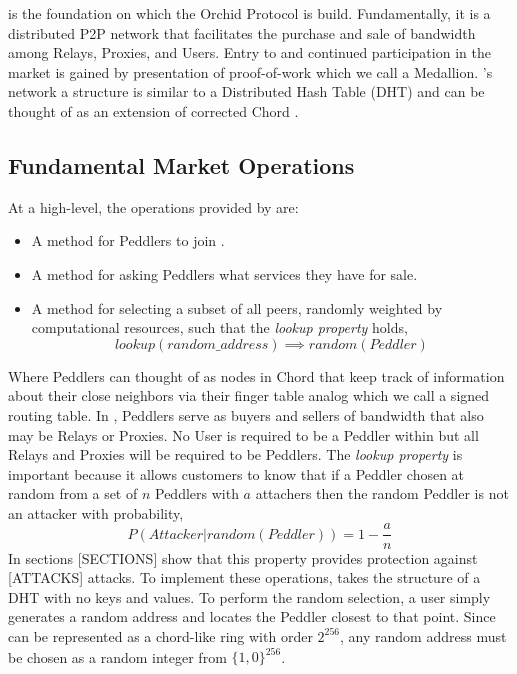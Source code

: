 
\TOM{} is the foundation on which the Orchid Protocol is build. Fundamentally, it is a distributed P2P network that facilitates the purchase and sale of bandwidth among Relays, Proxies, and Users. Entry to and continued participation in the market is gained by presentation of proof-of-work which we call a Medallion. \TOM{}'s network a structure is similar to a Distributed Hash Table (DHT) and can be thought of as an extension of corrected Chord \cite{ChordCorrect,CHORD}.

\subsection{Fundamental Market Operations}
\label{fund-market}


At a high-level, the operations provided by \tOM{} are:

\begin{itemize}
\item A method for Peddlers to join \tOM{}.
\item A method for asking Peddlers what services they have for sale.
\item A method for selecting a subset of all peers, randomly weighted by computational resources, such that the \emph{lookup property} holds,
						$$lookup(random\_address) \implies random(Peddler)$$
\end{itemize}

Where Peddlers can thought of as nodes in Chord that keep track of information about their close neighbors via their finger table analog which we call a signed routing table. In \TOM{}, Peddlers serve as buyers and sellers of bandwidth that also may be Relays or Proxies. No User is required to be a Peddler within \TOM{} but all Relays and Proxies will be required to be Peddlers. The \emph{lookup property} is important because it allows customers to know that if a Peddler chosen at random from a set of $n$ Peddlers with $a$ attachers then the random Peddler is not an attacker with probability,
						$$P(Attacker|random(Peddler)) = 1-\frac{a}{n}$$
In sections {\color{red}[SECTIONS]} show that this property provides protection against {\color{red}[ATTACKS]} attacks. To implement these operations, \tOM{} takes the structure of a DHT with no keys and values. To perform the random selection, a user simply generates a random address and locates the Peddler closest to that point. Since \TOM{} can be represented as a chord-like ring with order $2^{256}$, any random address must be chosen as a random integer from $\{1,0\}^{256}$.

